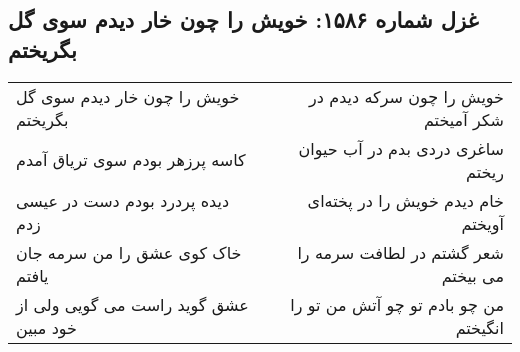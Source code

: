 \begin{center}
\section*{غزل شماره ۱۵۸۶: خویش را چون خار دیدم سوی گل بگریختم}
\label{sec:1586}
\begin{longtable}{l p{0.5cm} r}
خویش را چون خار دیدم سوی گل بگریختم
&&
خویش را چون سرکه دیدم در شکر آمیختم
\\
کاسه پرزهر بودم سوی تریاق آمدم
&&
ساغری دردی بدم در آب حیوان ریختم
\\
دیده پردرد بودم دست در عیسی زدم
&&
خام دیدم خویش را در پخته‌ای آویختم
\\
خاک کوی عشق را من سرمه جان یافتم
&&
شعر گشتم در لطافت سرمه را می بیختم
\\
عشق گوید راست می گویی ولی از خود مبین
&&
من چو بادم تو چو آتش من تو را انگیختم
\\
\end{longtable}
\end{center}
